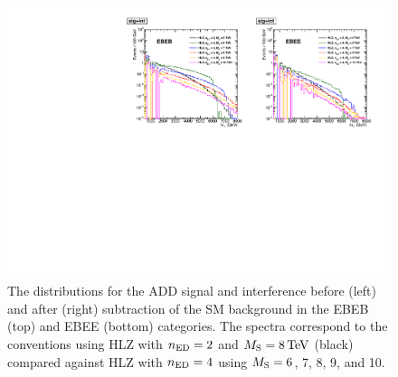 \begin{figure}[tbp!]
  \includegraphics[scale=0.82]{figures/HLZ_sig_int_left.pdf}
  \caption{The \Mgg distributions for the ADD signal and interference before (left) and after (right) subtraction of the SM background in the EBEB (top) and EBEE (bottom) categories. The spectra correspond to the \KK conventions using HLZ with $n_{\rm ED} = 2$ and $M_{\rm S} = 8\,\text{Te\hspace{-.08em}V}$ (black) compared against HLZ with $n_{\rm ED} = 4$ using $M_{\rm S} = 6$, 7, 8, 9, and 10\TeV.}
  \label{fig:signal_high_Ms}
\end{figure} 

